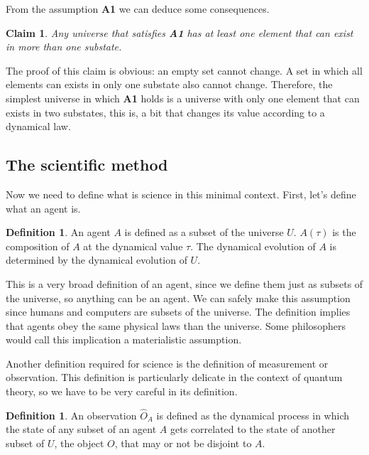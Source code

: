 \documentclass[11pt,a4paper,twoside]{report}
\newcommand{\+}{\textnormal{+} }
\newtheorem{myclaim}[mythm]{Claim}
\theoremstyle{definition}
\newtheorem{mydef}[mythm]{Definition}
\numberwithin{equation}{chapter}
\begin{document}
From the assumption \textbf{A1} we can deduce some consequences.
\begin{myclaim}
Any universe that satisfies \textbf{A1} has at least one element that can exist
in more than one substate.
\end{myclaim}

The proof of this claim is obvious: an empty set cannot change. A set in which
all elements can exists in only one substate also cannot change. Therefore, the
simplest universe in which \textbf{A1} holds is a universe with only one element
that can exists in two substates, this is, a bit that changes its value
according to a dynamical law.

\subsection{The scientific method}

Now we need to define what is science in this minimal context. First, let's
define what an agent is.

\begin{mydef}
  An agent $A$ is defined as a subset of the universe $U$. $A(\tau)$ is the
  composition of $A$ at the dynamical value $\tau$. The dynamical evolution of
  $A$ is determined by the dynamical evolution of $U$.
\end{mydef}

This is a very broad definition of an agent, since we define them just as
subsets of the universe, so anything can be an agent. We can safely make this
assumption since humans and computers are subsets of the universe. The
definition implies that agents obey the same physical laws than the universe.
Some philosophers would call this implication a materialistic assumption.

\par

Another definition required for science is the definition of measurement or
observation. This definition is particularly delicate in the context of quantum
theory, so we have to be very careful in its definition. 

\begin{mydef}
  An observation $\hat{O}_A$ is defined as the dynamical process in which the
  state of any subset of an agent $A$ gets correlated to the state of another
  subset of $U$, the object $O$, that may or not be disjoint to $A$.  
\end{mydef}
\end{document}
